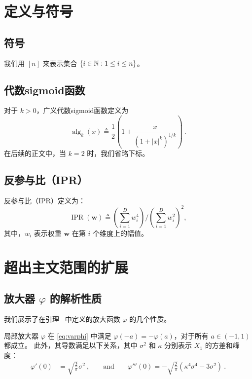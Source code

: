\section{定义与符号}

\subsection{符号}
我们用 $[n]$ 来表示集合 $\{ i \in \operatorname{\mathbb{N}} : 1 \leq i \leq n \}$。

\subsection{代数sigmoid函数}
\label{sec:algebraic-sigmoid}
对于 $k > 0$，广义代数sigmoid函数定义为
\begin{equation}
    \operatorname{alg}_k(x) \triangleq \frac{1}{2} \left( 1  + \frac{x}{(1+|x|^k)^{1/k}} \right)~.
\end{equation}
在后续的正文中，当 $k = 2$ 时，我们省略下标。
\subsection{反参与比（IPR）}  
\label{app:IPR}  
反参与比（IPR）定义为：  
$$ \operatorname{IPR}(\mathbf{w}) \triangleq \left(\sum_{i=1}^D w_i^4\right)/\left(\sum_{i=1}^D w_i^2\right)^2, $$  
其中，$w_i$ 表示权重 $\mathbf{w}$ 在第 $i$ 个维度上的幅值。
\section{超出主文范围的扩展}

\subsection{放大器 $\varphi$ 的解析性质}
\label{sec:varphi-analysis}

我们展示了在引理~ 中定义的放大函数 $\varphi$ 的几个性质。

\begin{lemma} \label{lem:varphi}
    局部放大器 $\varphi$ 在 \cref{eq:varphi} 中满足 $\varphi(-a) = -\varphi(a)$，对于所有 $a \in (-1,1)$ 都成立。  
    此外，其导数满足以下关系，其中 $\sigma^2$ 和 $\kappa$ 分别表示 $X_1$ 的方差和峰度：
    \vspace{-10pt}
    \begin{align*}
      \varphi'(0) &= \sqrt{\frac{2}{\pi}} \sigma^2~, &&\text { and }&&
      \varphi'''(0) = -\sqrt{\frac{2}{\pi}} (\kappa^4 \sigma^4 - 3 \sigma^2)~.
    \end{align*}
\end{lemma}
\vspace{-6pt}

